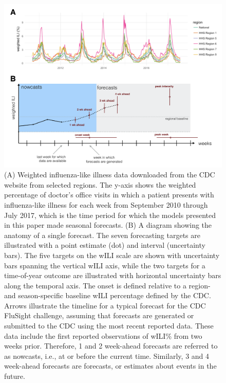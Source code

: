 \documentclass{article}\usepackage[]{graphicx}\usepackage[]{color}
\begin{document}
\begin{figure}[htbp]
\begin{center}
\includegraphics[width=\textwidth]{static-figures/timezero-sketch.pdf}
\caption{(A) Weighted influenza-like illness data downloaded from the CDC website from selected regions. The y-axis shows the weighted percentage of doctor's office visits in which a patient presents with influenza-like illness for each week from September 2010 through July 2017, which is the time period for which the models presented in this paper made seasonal forecasts. (B) A diagram showing the anatomy of a single forecast. The seven forecasting targets are illustrated with a point estimate (dot) and interval (uncertainty bars). The five targets on the wILI scale are shown with uncertainty bars spanning the vertical wILI axis, while the two targets for a time-of-year outcome are illustrated with horizontal uncertainty bars along the temporal axis. The onset is defined relative to a region- and season-specific baseline wILI percentage defined by the CDC.\cite{biggerstaff2018systematic} Arrows illustrate the timeline for a typical forecast for the CDC FluSight challenge, assuming that forecasts are generated or submitted to the CDC using the most recent reported data. These data include the first reported observations of wILI\% from two weeks prior. Therefore, 1 and 2 week-ahead forecasts are referred to as nowcasts, i.e., at or before the current time. Similarly, 3 and 4 week-ahead forecasts are forecasts, or estimates about events in the future.}
\label{fig:intro-schematic}
\end{center}
\end{figure}
\end{document}
